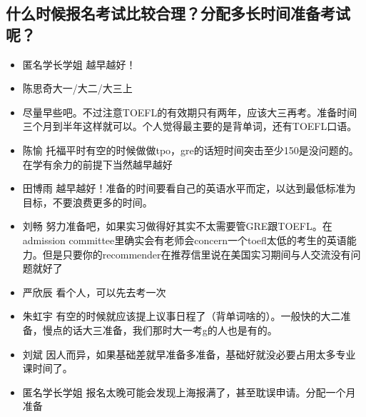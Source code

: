 \documentclass{vivid_layout}
\begin{document}
\subsection{ 什么时候报名考试比较合理？分配多长时间准备考试呢？}
\begin{itemize}
\item  {\name 匿名学长学姐}  \quad 越早越好！
\item { 陈思奇}\quad 大一/大二/大三上
\item 尽量早些吧。不过注意TOEFL的有效期只有两年，应该大三再考。准备时间三个月到半年这样就可以。个人觉得最主要的是背单词，还有TOEFL口语。
\item  { 陈愉}  \quad 托福平时有空的时候做做tpo，gre的话短时间突击至少150是没问题的。在学有余力的前提下当然越早越好
\item  { 田博雨}  \quad 越早越好！准备的时间要看自己的英语水平而定，以达到最低标准为目标，不要浪费更多的时间。
\item  { 刘畅}  \quad 努力准备吧，如果实习做得好其实不太需要管GRE跟TOEFL。在admission committee里确实会有老师会concern一个toefl太低的考生的英语能力。但是只要你的recommender在推荐信里说在美国实习期间与人交流没有问题就好了
\item  { 严欣辰}  \quad 看个人，可以先去考一次
\item  { 朱虹宇}  \quad 有空的时候就应该提上议事日程了（背单词啥的）。一般快的大二准备，慢点的话大三准备，我们那时大一考g的人也是有的。
\item  { 刘斌}  \quad 因人而异，如果基础差就早准备多准备，基础好就没必要占用太多专业课时间了。
\item  {\name 匿名学长学姐}  \quad 报名太晚可能会发现上海报满了，甚至耽误申请。分配一个月准备
\end{itemize}
\end{document}
